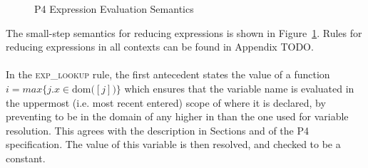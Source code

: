 \documentclass[UTF8]{article}
\begin{document}
\begin{figure}[ht!]
\caption{P4 Expression Evaluation Semantics}
\label{fig:semexp}
\end{figure}

The small-step semantics for reducing expressions is shown in Figure~\ref{fig:semexp}. Rules for reducing expressions in all contexts can be found in Appendix TODO.
\\~\\
In the \textsc{exp\_lookup} rule, the first antecedent states the value of a function $i = max  \{ j . x  \in \mathrm{dom} ( $\currsf$ [j] ) \} $ which ensures that the variable name \str{} is evaluated in the uppermost (i.e. most recent entered) scope of \currsf{} where it is declared, by preventing \str{} to be in the domain of any \scope{} higher in \currsf{} than the one used for variable resolution. This agrees with the description in Sections  and  of the P4 specification. The value of this variable is then resolved, and checked to be a constant.\\~\\
\end{document}
